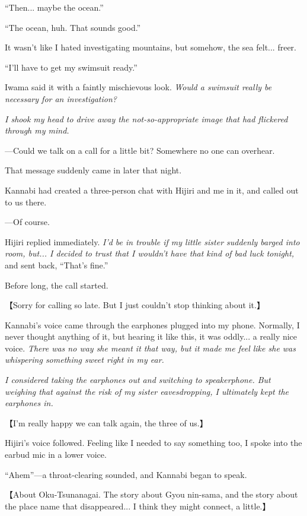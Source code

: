 \documentclass[
    a4paper,
    12pt,
    twoside,
    openany,
    UTF8,
    fontset=windows
]{ctexbook}
\begin{document}
``Then... maybe the ocean.''

``The ocean, huh. That sounds good.''

It wasn't like I hated investigating mountains, but somehow, the sea felt... freer.

``I'll have to get my swimsuit ready.''

Iwama said it with a faintly mischievous look. \textit{Would a swimsuit really be necessary for an investigation?}

\textit{I shook my head to drive away the not-so-appropriate image that had flickered through my mind.}

---Could we talk on a call for a little bit? Somewhere no one can overhear.

That message suddenly came in later that night.

Kannabi had created a three-person chat with Hijiri and me in it, and called out to us there.

---Of course.

Hijiri replied immediately. \textit{I'd be in trouble if my little sister suddenly barged into room, but... I decided to trust that I wouldn't have that kind of bad luck tonight,} and sent back, ``That's fine.''

Before long, the call started.

【Sorry for calling so late. But I just couldn't stop thinking about it.】

Kannabi's voice came through the earphones plugged into my phone. Normally, I never thought anything of it, but hearing it like this, it was oddly... a really nice voice. \textit{There was no way she meant it that way, but it made me feel like she was whispering something sweet right in my ear.}

\textit{I considered taking the earphones out and switching to speakerphone. But weighing that against the risk of my sister eavesdropping, I ultimately kept the earphones in.}

【I'm really happy we can talk again, the three of us.】

Hijiri's voice followed. Feeling like I needed to say something too, I spoke into the earbud mic in a lower voice.

``Ahem''---a throat-clearing sounded, and Kannabi began to speak.

【About Oku-Tsunanagai. The story about Gyou nin-sama, and the story about the place name that disappeared... I think they might connect, a little.】
\end{document}
